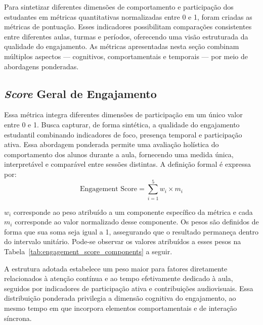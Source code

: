 Para sintetizar diferentes dimensões de comportamento e participação dos estudantes em métricas quantitativas normalizadas entre 0 e 1, foram criadas as métricas de pontuação. Esses indicadores possibilitam comparações consistentes entre diferentes aulas, turmas e períodos, oferecendo uma visão estruturada da qualidade do engajamento. As métricas apresentadas nesta seção combinam múltiplos aspectos — cognitivos, comportamentais e temporais — por meio de abordagens ponderadas.

\subsection{\textit{Score} Geral de Engajamento}
Essa métrica integra diferentes dimensões de participação em um único valor entre 0 e 1. Busca capturar, de forma sintética, a qualidade do engajamento estudantil combinando indicadores de foco, presença temporal e participação ativa. Essa abordagem ponderada permite uma avaliação holística do comportamento dos alunos durante a aula, fornecendo uma medida única, interpretável e comparável entre sessões distintas. A definição formal é expressa por:
\begin{equation}
\text{Engagement Score} = \sum_{i=1}^{5} w_i \times m_i
\end{equation}

$w_i$ corresponde ao peso atribuído a um componente específico da métrica e cada $m_i$ corresponde ao valor normalizado desse componente. Os pesos são definidos de forma que sua soma seja igual a 1, assegurando que o resultado permaneça dentro do intervalo unitário. Pode-se observar os valores atribuídos a esses pesos na Tabela~\ref{tab:engagement_score_components} a seguir.



A estrutura adotada estabelece um peso maior para fatores diretamente relacionados à atenção contínua e ao tempo efetivamente dedicado à aula, seguidos por indicadores de participação ativa e contribuições audiovisuais. Essa distribuição ponderada privilegia a dimensão cognitiva do engajamento, ao mesmo tempo em que incorpora elementos comportamentais e de interação síncrona.


